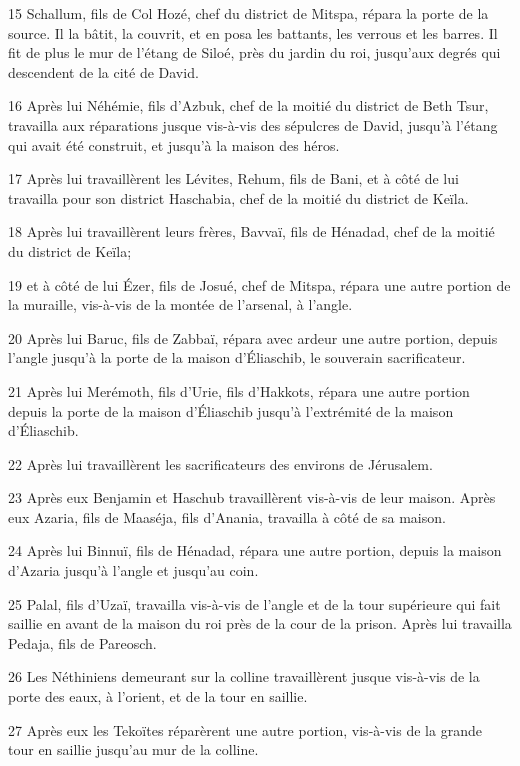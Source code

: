 \par 15 Schallum, fils de Col Hozé, chef du district de Mitspa, répara la porte de la source. Il la bâtit, la couvrit, et en posa les battants, les verrous et les barres. Il fit de plus le mur de l'étang de Siloé, près du jardin du roi, jusqu'aux degrés qui descendent de la cité de David.
\par 16 Après lui Néhémie, fils d'Azbuk, chef de la moitié du district de Beth Tsur, travailla aux réparations jusque vis-à-vis des sépulcres de David, jusqu'à l'étang qui avait été construit, et jusqu'à la maison des héros.
\par 17 Après lui travaillèrent les Lévites, Rehum, fils de Bani, et à côté de lui travailla pour son district Haschabia, chef de la moitié du district de Keïla.
\par 18 Après lui travaillèrent leurs frères, Bavvaï, fils de Hénadad, chef de la moitié du district de Keïla;
\par 19 et à côté de lui Ézer, fils de Josué, chef de Mitspa, répara une autre portion de la muraille, vis-à-vis de la montée de l'arsenal, à l'angle.
\par 20 Après lui Baruc, fils de Zabbaï, répara avec ardeur une autre portion, depuis l'angle jusqu'à la porte de la maison d'Éliaschib, le souverain sacrificateur.
\par 21 Après lui Merémoth, fils d'Urie, fils d'Hakkots, répara une autre portion depuis la porte de la maison d'Éliaschib jusqu'à l'extrémité de la maison d'Éliaschib.
\par 22 Après lui travaillèrent les sacrificateurs des environs de Jérusalem.
\par 23 Après eux Benjamin et Haschub travaillèrent vis-à-vis de leur maison. Après eux Azaria, fils de Maaséja, fils d'Anania, travailla à côté de sa maison.
\par 24 Après lui Binnuï, fils de Hénadad, répara une autre portion, depuis la maison d'Azaria jusqu'à l'angle et jusqu'au coin.
\par 25 Palal, fils d'Uzaï, travailla vis-à-vis de l'angle et de la tour supérieure qui fait saillie en avant de la maison du roi près de la cour de la prison. Après lui travailla Pedaja, fils de Pareosch.
\par 26 Les Néthiniens demeurant sur la colline travaillèrent jusque vis-à-vis de la porte des eaux, à l'orient, et de la tour en saillie.
\par 27 Après eux les Tekoïtes réparèrent une autre portion, vis-à-vis de la grande tour en saillie jusqu'au mur de la colline.
